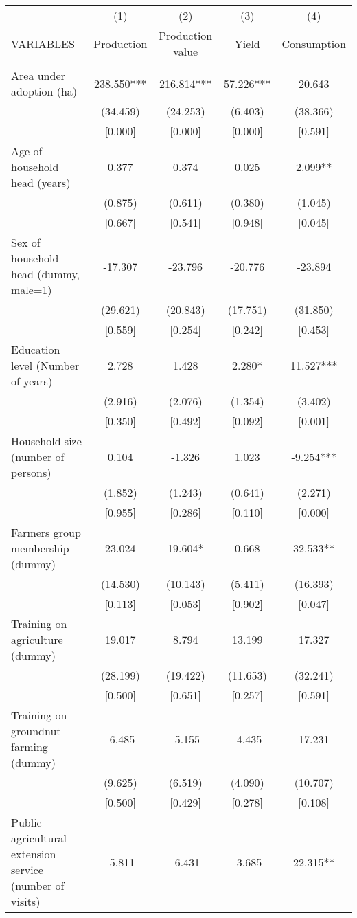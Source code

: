 \documentclass[]{article}
\begin{document}
\begin{tabular}{lcccc} \hline
 & (1) & (2) & (3) & (4) \\
VARIABLES & Production & Production value & Yield & Consumption \\ \hline
 &  &  &  &  \\
Area under adoption (ha) & 238.550*** & 216.814*** & 57.226*** & 20.643 \\
 & (34.459) & (24.253) & (6.403) & (38.366) \\
 & [0.000] & [0.000] & [0.000] & [0.591] \\
Age of household head (years) & 0.377 & 0.374 & 0.025 & 2.099** \\
 & (0.875) & (0.611) & (0.380) & (1.045) \\
 & [0.667] & [0.541] & [0.948] & [0.045] \\
Sex of household head (dummy, male=1) & -17.307 & -23.796 & -20.776 & -23.894 \\
 & (29.621) & (20.843) & (17.751) & (31.850) \\
 & [0.559] & [0.254] & [0.242] & [0.453] \\
Education level (Number of years) & 2.728 & 1.428 & 2.280* & 11.527*** \\
 & (2.916) & (2.076) & (1.354) & (3.402) \\
 & [0.350] & [0.492] & [0.092] & [0.001] \\
Household size (number of persons) & 0.104 & -1.326 & 1.023 & -9.254*** \\
 & (1.852) & (1.243) & (0.641) & (2.271) \\
 & [0.955] & [0.286] & [0.110] & [0.000] \\
Farmers group membership (dummy) & 23.024 & 19.604* & 0.668 & 32.533** \\
 & (14.530) & (10.143) & (5.411) & (16.393) \\
 & [0.113] & [0.053] & [0.902] & [0.047] \\
Training on agriculture (dummy) & 19.017 & 8.794 & 13.199 & 17.327 \\
 & (28.199) & (19.422) & (11.653) & (32.241) \\
 & [0.500] & [0.651] & [0.257] & [0.591] \\
Training on groundnut farming (dummy) & -6.485 & -5.155 & -4.435 & 17.231 \\
 & (9.625) & (6.519) & (4.090) & (10.707) \\
 & [0.500] & [0.429] & [0.278] & [0.108] \\
Public agricultural extension service (number of visits) & -5.811 & -6.431 & -3.685 & 22.315** \\

\end{tabular}
\end{document}
